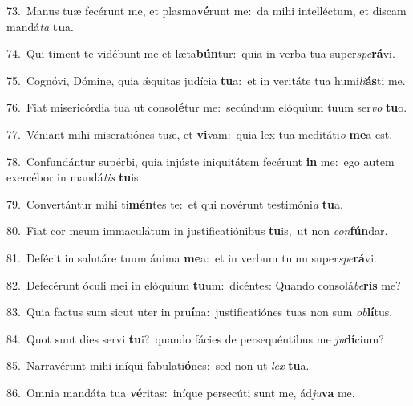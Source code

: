 {\numbfont\textcolor{\numbcolor}{73.}}~Manus tuæ fecérunt me, et plasma\-\textbf{vé}\-runt me:~\star da mihi intelléctum, et discam mandá\textit{ta} \textbf{tu}\-a.\par
{\numbfont\textcolor{\numbcolor}{74.}}~Qui timent te vidébunt me et læta\-\textbf{bún}\-tur:~\star quia in verba tua super\-\textit{spe}\-\textbf{rá}vi.\par
{\numbfont\textcolor{\numbcolor}{75.}}~Cognóvi, Dómine, quia ǽquitas judícia \textbf{tu}\-a:~\star et in veritáte tua humi\-\textit{li}\-\textbf{ás}ti me.\par
{\numbfont\textcolor{\numbcolor}{76.}}~Fiat misericórdia tua ut conso\-\textbf{lé}\-tur me:~\star secúndum elóquium tuum ser\textit{vo} \textbf{tu}\-o.\par
{\numbfont\textcolor{\numbcolor}{77.}}~Véniant mihi miseratiónes tuæ, et \textbf{vi}\-vam:~\star quia lex tua meditáti\textit{o} \textbf{me}\-a est.\par
{\numbfont\textcolor{\numbcolor}{78.}}~Confundántur supérbi, quia injúste iniquitátem fecérunt \textbf{in} me:~\star ego autem exercébor in mandá\textit{tis} \textbf{tu}\-is.\par
{\numbfont\textcolor{\numbcolor}{79.}}~Convertántur mihi ti\-\textbf{mén}\-tes te:~\star et qui novérunt testimóni\textit{a} \textbf{tu}\-a.\par
{\numbfont\textcolor{\numbcolor}{80.}}~Fiat cor meum immaculátum in justificatiónibus \textbf{tu}\-is,~\star ut non \textit{con}\-\textbf{fún}dar.\par
{\numbfont\textcolor{\numbcolor}{81.}}~Defécit in salutáre tuum ánima \textbf{me}\-a:~\star et in verbum tuum super\-\textit{spe}\-\textbf{rá}vi.\par
{\numbfont\textcolor{\numbcolor}{82.}}~Defecérunt óculi mei in elóquium \textbf{tu}\-um:~\star dicéntes: Quando consolá\-\textit{be}\-\textbf{ris} me?\par
{\numbfont\textcolor{\numbcolor}{83.}}~Quia factus sum sicut uter in pru\-\textbf{í}\-na:~\star justificatiónes tuas non sum \textit{ob}\-\textbf{lí}tus.\par
{\numbfont\textcolor{\numbcolor}{84.}}~Quot sunt dies servi \textbf{tu}\-i?~\star quando fácies de persequéntibus me \textit{ju}\-\textbf{dí}cium?\par
{\numbfont\textcolor{\numbcolor}{85.}}~Narravérunt mihi iníqui fabulati\-\textbf{ó}\-nes:~\star sed non ut \textit{lex} \textbf{tu}\-a.\par
{\numbfont\textcolor{\numbcolor}{86.}}~Omnia mandáta tua \textbf{vé}\-ritas:~\star iníque persecúti sunt me, ád\-\textit{ju}\-\textbf{va} me.\par
